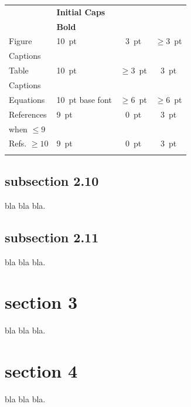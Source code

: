 \documentclass[letter,
               biblatex,     %
               keeplastbox,   %
               ]{jacow}
\begin{document}
\begin{table}[h!b]
\begin{tabular}{llcc}
                            & \textbf{Initial Caps}       &                 &      \\
		& \textbf{Bold}               &                 &      \\[5pt]
		Figure        & \SI{10}{pt}                 & \SI{3}{pt}      & $\ge$\SI{3}{pt}  \\
		Captions      &                             &                 &      \\[5pt]
		Table         & \SI{10}{pt}                 & $\ge$\SI{3}{pt} & \SI{3}{pt}  \\
		Captions	  &                             &                 &      \\[5pt]
		Equations     & \SI{10}{pt} base font       & $\ge$\SI{6}{pt}     & $\ge$\SI{6}{pt} \\[5pt]
		References      & \SI{9}{pt}				& \SI{0}{pt}      & \SI{3}{pt} \\
        when $\le9$ 	& \verb||	&                 &  \\[5pt]
        Refs. $\ge10$ 	& \SI{9}{pt}				& \SI{0}{pt}      & \SI{3}{pt}  \\
                		& \verb||	&    &    \\
		\bottomrule   %
	\end{tabular}
\end{table}

\subsection{subsection 2.10}

bla bla bla.

\subsection{subsection 2.11}

bla bla bla. 

\section{section 3}

bla bla bla.

\section{section 4}

bla bla bla.
\end{document}
